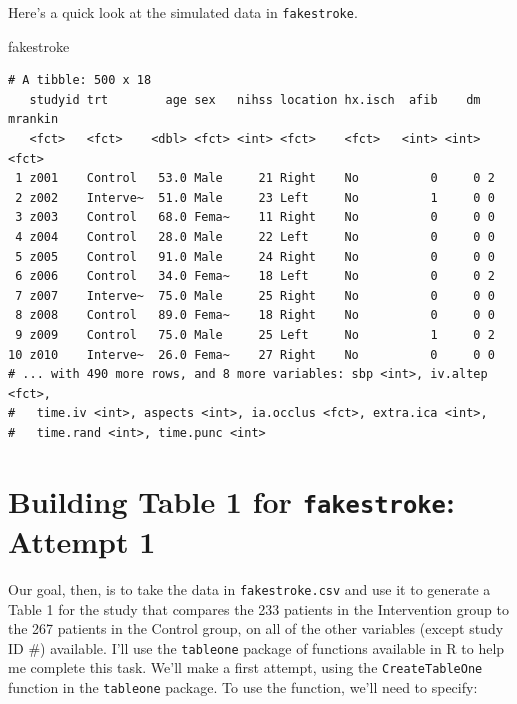 \documentclass[]{book}
\newenvironment{Shaded}{\begin{snugshade}}{\end{snugshade}}
\newcommand{\NormalTok}[1]{#1}
\theoremstyle{definition}
\theoremstyle{definition}
\theoremstyle{definition}
\theoremstyle{remark}
\begin{document}
Here's a quick look at the simulated data in \texttt{fakestroke}.

\begin{Shaded}
\begin{Highlighting}[]
\NormalTok{fakestroke}
\end{Highlighting}
\end{Shaded}

\begin{verbatim}
# A tibble: 500 x 18
   studyid trt        age sex   nihss location hx.isch  afib    dm mrankin
   <fct>   <fct>    <dbl> <fct> <int> <fct>    <fct>   <int> <int> <fct>  
 1 z001    Control   53.0 Male     21 Right    No          0     0 2      
 2 z002    Interve~  51.0 Male     23 Left     No          1     0 0      
 3 z003    Control   68.0 Fema~    11 Right    No          0     0 0      
 4 z004    Control   28.0 Male     22 Left     No          0     0 0      
 5 z005    Control   91.0 Male     24 Right    No          0     0 0      
 6 z006    Control   34.0 Fema~    18 Left     No          0     0 2      
 7 z007    Interve~  75.0 Male     25 Right    No          0     0 0      
 8 z008    Control   89.0 Fema~    18 Right    No          0     0 0      
 9 z009    Control   75.0 Male     25 Left     No          1     0 2      
10 z010    Interve~  26.0 Fema~    27 Right    No          0     0 0      
# ... with 490 more rows, and 8 more variables: sbp <int>, iv.altep <fct>,
#   time.iv <int>, aspects <int>, ia.occlus <fct>, extra.ica <int>,
#   time.rand <int>, time.punc <int>
\end{verbatim}

\section{\texorpdfstring{Building Table 1 for \texttt{fakestroke}:
Attempt
1}{Building Table 1 for fakestroke: Attempt 1}}\label{building-table-1-for-fakestroke-attempt-1}

Our goal, then, is to take the data in \texttt{fakestroke.csv} and use
it to generate a Table 1 for the study that compares the 233 patients in
the Intervention group to the 267 patients in the Control group, on all
of the other variables (except study ID \#) available. I'll use the
\texttt{tableone} package of functions available in R to help me
complete this task. We'll make a first attempt, using the
\texttt{CreateTableOne} function in the \texttt{tableone} package. To
use the function, we'll need to specify:
\end{document}
